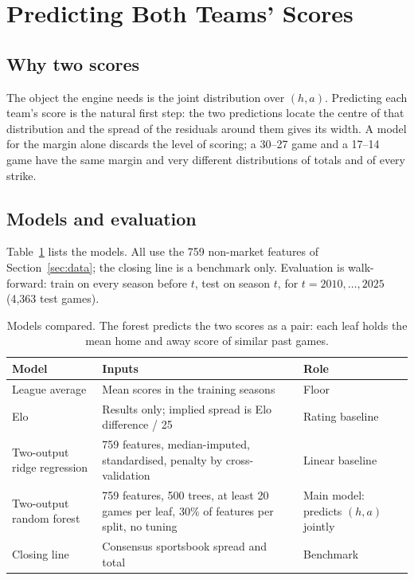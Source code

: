 \section{Predicting Both Teams' Scores}\label{sec:scoremodel}

\subsection{Why two scores}

The object the engine needs is the joint distribution over $(h,a)$. Predicting each team's score is the natural first step: the two predictions locate the centre of that distribution and the spread of the residuals around them gives its width. A model for the margin alone discards the level of scoring; a 30--27 game and a 17--14 game have the same margin and very different distributions of totals and of every strike.

\subsection{Models and evaluation}

Table~\ref{tab:models} lists the models. All use the 759 non-market features of Section~\ref{sec:data}; the closing line is a benchmark only. Evaluation is walk-forward: train on every season before $t$, test on season $t$, for $t = 2010,\dots,2025$ (4,363 test games).

\begin{table}[H]
\centering
\small
\begin{tabular}{p{3.6cm}p{6.2cm}p{4cm}}
\toprule
\textbf{Model} & \textbf{Inputs} & \textbf{Role} \\
\midrule
League average & Mean scores in the training seasons & Floor \\
Elo & Results only; implied spread is Elo difference / 25 & Rating baseline \\
Two-output ridge regression & 759 features, median-imputed, standardised, penalty by cross-validation & Linear baseline \\
Two-output random forest & 759 features, 500 trees, at least 20 games per leaf, 30\% of features per split, no tuning & Main model: predicts $(h,a)$ jointly \\
Closing line & Consensus sportsbook spread and total & Benchmark \\
\bottomrule
\end{tabular}
\caption{Models compared. The forest predicts the two scores as a pair: each leaf holds the mean home and away score of similar past games.}
\label{tab:models}
\end{table}

